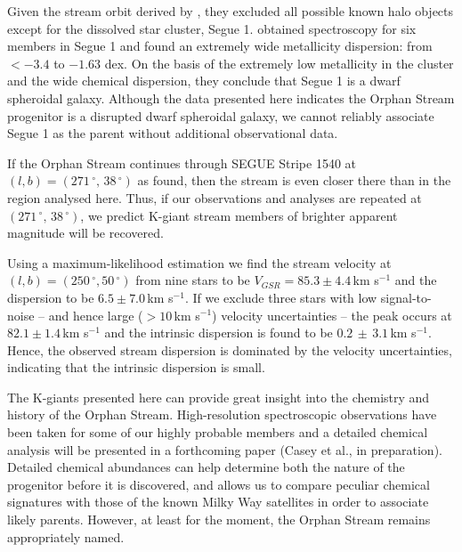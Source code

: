 Given the stream orbit derived by \citet{Newberg_et-al_2010}, they excluded all possible known halo objects except for the dissolved star cluster, Segue 1. \citet{Simon_et-al_2011} obtained spectroscopy for six members in Segue 1 and found an extremely wide metallicity dispersion: from $<-3.4$ to $-1.63$ dex. On the basis of the extremely low metallicity in the cluster and the wide chemical dispersion, they conclude that Segue 1 is a dwarf spheroidal galaxy. Although the data presented here indicates the Orphan Stream progenitor is a disrupted dwarf spheroidal galaxy, we cannot reliably associate Segue 1 as the parent without additional observational data. 

If the Orphan Stream continues through SEGUE Stripe 1540 at $(l, b) = (271\,^\circ,\,38\,^\circ)$ as \citet{Newberg_et-al_2010} found, then the stream is even closer there than in the region analysed here. Thus, if our observations and analyses are repeated at $(271\,^\circ,\,38\,^\circ)$, we predict K-giant stream members of brighter apparent magnitude will be recovered. 

Using a maximum-likelihood estimation we find the stream velocity at $(l, b) = (250\,^\circ, 50\,^\circ)$ from nine stars to be $V_{GSR} = 85.3 \pm 4.4$\,km s$^{-1}$ and the dispersion to be $6.5 \pm 7.0$\,km s$^{-1}$. If we exclude three stars with low signal-to-noise \--- and hence large ($> 10$\,km s$^{-1}$) velocity uncertainties \--- the peak occurs at $82.1 \pm 1.4$\,km s$^{-1}$ and the intrinsic dispersion is found to be $0.2\,\pm\,3.1$\,km s$^{-1}$. Hence, the observed stream dispersion is dominated by the velocity uncertainties, indicating that the intrinsic dispersion is small. 

The K-giants presented here can provide great insight into the chemistry and history of the Orphan Stream. High-resolution spectroscopic observations have been taken for some of our highly probable members and a detailed chemical analysis will be presented in a forthcoming paper (Casey et al., in preparation). Detailed chemical abundances can help determine both the nature of the progenitor before it is discovered, and allows us to compare peculiar chemical signatures with those of the known Milky Way satellites in order to associate likely parents. However, at least for the moment, the Orphan Stream remains appropriately named.

